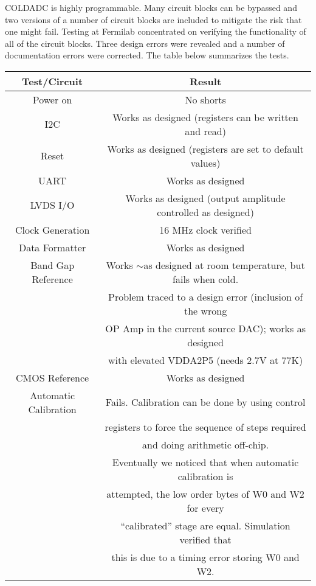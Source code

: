 \label{sec:3}

COLDADC is highly programmable.  Many circuit blocks can be bypassed and two versions of a number of circuit blocks are included to mitigate the risk that one might fail.  Testing at Fermilab concentrated on verifying the functionality of all of the circuit blocks.  Three design errors were revealed and a number of documentation errors were corrected.  The table below summarizes the tests.
 
 \begin{table}[h]
\centering
\begin{tabular}{|c|c|}
\hline
\textbf{ Test/Circuit} & Result  \\ \hline \hline
Power on &  No shorts \\ \hline
I2C & Works as designed (registers can be written and read) \\ \hline
Reset & Works as designed (registers are set to default values) \\ \hline
UART & Works as designed \\ \hline
LVDS I/O & Works as designed (output amplitude controlled as designed) \\ \hline
Clock Generation & 16 MHz clock verified \\ \hline
Data Formatter & Works as designed \\ \hline
Band Gap Reference & Works $\sim$as designed at room temperature, but fails when cold. \\ 
 & Problem traced to a design error (inclusion of the wrong \\ 
 &  OP Amp in the current source DAC); works as designed \\ 
 &  with elevated VDDA2P5 (needs 2.7V at 77K) \\ \hline
 CMOS Reference & Works as designed \\ \hline
 Automatic Calibration & Fails.  Calibration can be done by using control \\ 
  & registers to force the sequence of steps required \\ 
   & and doing arithmetic off-chip.\\ 
    & Eventually we noticed that when automatic calibration is \\ 
     & attempted, the low order bytes of W0 and W2 for every \\ 
      & ``calibrated'' stage are equal. Simulation verified that  \\ 
       & this is due to a timing error storing W0 and W2. \\ \hline

\end{tabular}
\end{table}
